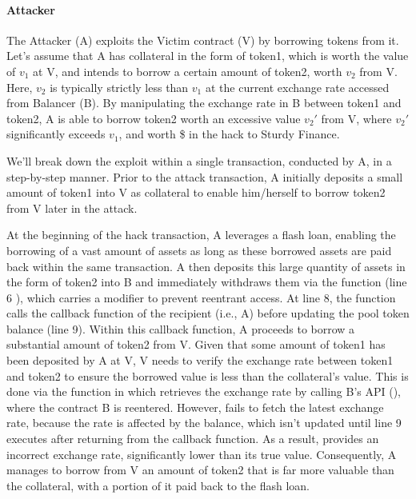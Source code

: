 \paragraph{Attacker} The Attacker (A) exploits the Victim contract (V) by borrowing tokens from it. Let's assume that A has collateral in the form of token1, which is worth the value of $v_1$ at V, and intends to borrow a certain amount of token2, worth $v_2$ from V. Here, $v_2$ is typically strictly less than $v_1$ at the current exchange rate accessed from Balancer (B). By manipulating the exchange rate in B between token1 and token2, A is able to borrow token2 worth an excessive value $v_2'$ from V, where $v_2'$ significantly exceeds $v_1$, and worth \$ in the hack to Sturdy Finance. 


We'll break down the exploit within a single transaction, conducted by A, in a step-by-step manner.  Prior to the attack transaction, A initially deposits a small amount of token1 into V as collateral to enable him/herself to borrow token2 from V later in the attack. 

At the beginning of the hack transaction, A leverages a flash loan, enabling the borrowing of a vast amount of assets as long as these borrowed assets are paid back within the same transaction.
A then deposits this large quantity of assets in the form of token2  into B and immediately withdraws them via the  function (line 6 ), which carries a  modifier to prevent reentrant access.
At line 8, the  function calls the callback function of the recipient (i.e., A) before updating the pool token balance (line 9). Within this callback function, A proceeds to borrow a substantial amount of token2 from V. Given that some amount of token1 has been deposited by A at V, V needs to verify the exchange rate between token1 and token2 to ensure the borrowed value is less than the collateral's value. This is done via the  function in   which retrieves the exchange rate by calling B's  API (), where the contract B is reentered.  However, 
fails to fetch the latest exchange rate, because the rate is affected by the balance, which isn't updated until line 9 executes after returning from the callback function. As a result,  provides an incorrect exchange rate, significantly lower than its true value. Consequently, A manages to borrow from V an amount of token2 that is far more valuable than the collateral, with a portion of it paid back to the flash loan.


